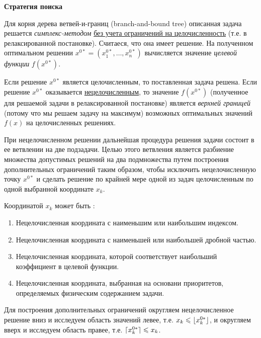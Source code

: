 \documentclass[%
	11pt,
	a4paper,
	utf8,
		]{article}
\begin{document}

\textbf{Стратегия поиска}

Для корня дерева ветвей-и-границ (branch-and-bound tree) описанная задача решается \emph{симплекс-методом} \underline{без учета ограничений на целочисленность} (т.е. в релаксированной постановке). Считаеся, что она имеет решение. На полученном оптимальном решении $ x^{0*} = (x_1^{0*}, \ldots, x_n^{0*}) $ вычисляется значение \emph{целевой функции} $ f(x^{0*}) $.

Если решение $ x^{0*} $ является целочисленным, то поставленная задача решена. Если решение $ x^{0*} $ оказывается \underline{нецелочисленным}, то значение $ f(x^{0*}) $ (полученное для решаемой задачи в релаксированной постановке) является \emph{верхней границей} (потому что мы решаем задачу на максимум) возможных оптимальных значений $ f(x) $ на целочисленных решениях.

При нецелочисленном решении дальнейшая процедура решения задачи состоит в ее ветвлении на две подзадачи. Целью этого ветвления является разбиение множества допустимых решений на два подмножества путем построения дополнительных ограничений таким образом, чтобы исключить нецелочисленную точку $ x^{0*} $ и сделать решение по крайней мере одной из задач целочисленным по одной выбранной координате $ x_k $.

Координатой $ x_k $ может быть \cite[]{panteleev}:
\begin{enumerate}
	\item Нецелочисленная координата с наименьшим или наибольшим индексом.
	
	\item Нецелочисленная координата с наименьшей или наибольшей дробной частью.
	
	\item Нецелочисленная координата, которой соответствует наибольший коэффициент в целевой функции.
	
	\item Нецелочисленная координата, выбранная на основани приоритетов, определяемых физическим содержанием задачи.
\end{enumerate}

Для построения дополнительных ограничений округляем нецелочисленное решение вниз и исследуем область значений левее, т.е. $ x_k \leqslant \lfloor x_k^{0*}\rfloor $, и округляем вверх и исследуем область правее, т.е. $ \lceil x_k^{0*}\rceil \leqslant x_k $.
\end{document}
